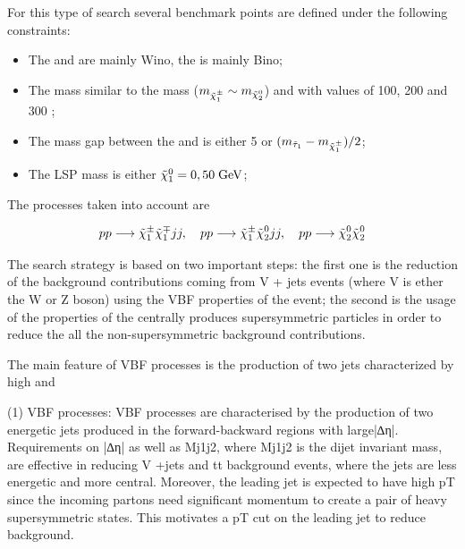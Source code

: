 For this type of search several benchmark points are defined under the following constraints:
\begin{itemize}
	\item The \charginopm and \neutralinotwo are mainly Wino, the \neutralinoone is mainly Bino;
	\item The \charginomp mass similar to the \neutralinotwo mass ($m_{\tilde{\chi}^{\pm}_{1}} \sim m_{\tilde{\chi}^{0}_{2}}$) and with values of 100, 200 and 300 \gev;
	\item The mass gap between the \stau and \charginopm is either 5 \gev or $(m_{\tilde{\tau}_{1}} - m_{\tilde{\chi}^{\pm}_{1}})/2$;
	\item The LSP mass is either $\tilde{\chi}^{0}_{1} = 0 , 50 \;\text{Ge}\kern-0.06667em\text{V}$;
\end{itemize}

The processes taken into account are

\begin{equation}
pp \longrightarrow \tilde{\chi}^{\pm}_{1} \tilde{\chi}^{\mp}_{1} jj, \quad pp \longrightarrow \tilde{\chi}^{\pm}_{1} \tilde{\chi}^{0}_{2} jj, \quad pp \longrightarrow \tilde{\chi}^{0}_{2} \tilde{\chi}^{0}_{2}
\end{equation}


The search strategy is based on two important steps: the first one is the reduction of the background contributions coming from V + jets events (where V is ether the W or Z boson) using the VBF properties of the event; the second is the usage of the properties of the centrally produces supersymmetric particles in order to reduce the all the non-supersymmetric background contributions.

The main feature of VBF processes is the production of two jets characterized by high \pt and 

(1) VBF processes: VBF processes are characterised by the production of two energetic jets produced in the forward-backward regions with large|∆η|. Requirements on |∆η| as well as Mj1j2, where Mj1j2 is the dijet invariant mass, are eﬀective in reducing V +jets and tt background events, where the jets are less energetic and more central. Moreover, the leading jet is expected to have high pT since the incoming partons need signiﬁcant momentum to create a pair of heavy supersymmetric states. This motivates a pT cut on the leading jet to reduce background.


